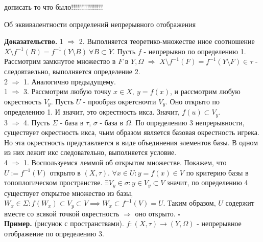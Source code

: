 дописать то что было!!!!!!!!!!!!!!!!
\begin{theor}
Об эквивалентности определений непрерывного отображения
\end{theor}
\textbf{Доказательство.}  1 $\Rightarrow$ 2. Выполняется теоретико-множестве
нное соотношение 
$X\setminus f^{-1}(B)=f^{-1}(Y\setminus B)~\forall B\subset Y$.
Пусть $f$ - непрерывно по определению 1. Рассмотрим замкнутое множество в 
$F$ в  $Y,\Omega$  $\Rightarrow$ $X\setminus f^{-1}(F)=f^{-1}(Y\setminus 
F)\in\tau$ - следовтаельно, выполняется определение 2.\\
2 $\Rightarrow$ 1. Аналогично предыдущему.\\
1 $\Rightarrow$ 3. Рассмотрим любую точку $x\in X,~y=f(x)$, и рассмотрим
любую окрестность  $V_y$. Пусть  $U$ - прообраз окретсночти $V_y$. Оно открыто 
по определению 1. И значит, это окрестность икса. Значит,
$f(u)\subset V_y$.\\
3 $\Rightarrow$ 4. Пусть $\Sigma$ - база в  $\tau$,  $\sigma$ - база в 
$\Omega$. По определению 3 непрерывности, существует окрестность икса,
чьим образом является базовая окрестность игрека. Но эта окрестность
представляется в виде объединения элементов базы. В одном из них лежит икс
следовательно, выполняется условие.\\
4 $\Rightarrow$ 1. Воспользуемся леммой об открытом множестве. Покажем, что
$U:=f^{-1}(V)$ открыто в  $(X,\tau)$.  $\forall x\in U:y=f(x)\in V$ по 
критерию базы в топоплогическом пространстве. $\exists V_y\in\sigma:y\in V_y
\subset V$ значит, по определению 4 существует открытое множество из базы, 
$W_x\in\Sigma:f(W_x)\subset V_y\subset V\implies W_x\subset f^{-1}(V)=U$.
Таким образом, $U$ содержит вместе со всякой точкой окрестность  $\Rightarrow$ 
оно открыто. $\square$\\
\textbf{Пример.} (рисунок с пространствами).
$f\colon(X,\tau)\to(Y,\Omega)$ - непрерывное отображение по определению 3.

